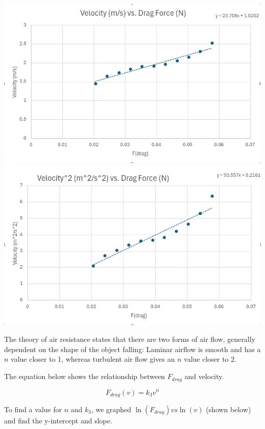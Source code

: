 \documentclass[12pt]{article}
\begin{document}
\begin{center}
    \includegraphics[scale=0.60]{v_vs_drag.png}
    \includegraphics[scale=0.60]{v2_vs_drag2.png}
\end{center}

The theory of air resistance states that there are two forms of air flow, generally dependent on the shape of the object falling:
Laminar airflow is smooth and has a $n$ value closer to 1, whereas turbulent air flow gives an $n$ value closer to 2.

The equation below shows the relationship between $F_{drag}$ and velocity.

\[ F_{drag}(v) = k_3v^n \]

To find a value for $n$ and $k_3$, we graphed $\ln(F_{drag}) vs \ln(v)$ (shown below) and find the y-intercept and slope.
\end{document}
